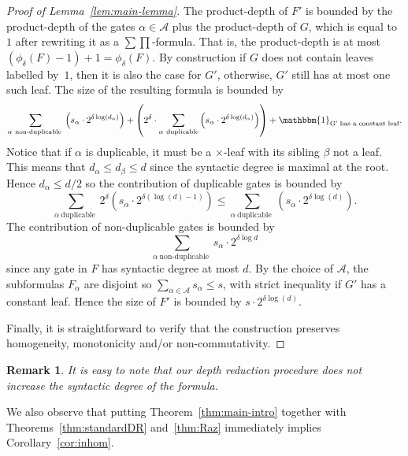 \documentclass[11pt,a4paper]{article}
\newtheorem{remark}[theorem]{Remark}
\newcommand{\comment}[2]{\marginpar{\tiny{\textbf{#1: }\textit{#2}}}}
\newcommand{\nl}[1]{\comment{NL}{#1}}
\begin{document}
\begin{proof}[Proof of Lemma~\ref{lem:main-lemma}]
	
	The product-depth of $F'$ is bounded by the product-depth of the gates $\alpha \in \mathcal{A}$ plus the product-depth of $G$, which is equal to $1$ after rewriting it as a $\sum\prod$-formula. That is, the product-depth is at most  \((\phi_{\delta}(F)-1)+1 = \phi_{\delta}(F)\). By construction if \(G\) does not contain  leaves labelled by~$1$, then it is also the case for \(G'\), otherwise, \(G'\) still has at most one such leaf.
	The size of the resulting formula is bounded by
	\[ 	\sum_{\alpha\ \text{non-duplicable }} \left(s_\alpha \cdot 2^{\delta \log(d_\alpha)} \right)  
	+
	\left( 2^{\delta} \cdot \sum_{\alpha\ \text{duplicable}} \left(s_\alpha \cdot 2^{\delta \log(d_\alpha)} \right) \right) 
	+ \mathbbm{1}_{\text{G' has a constant leaf}} . \]
	Notice that if $\alpha$ is duplicable, it must be a \(\times\)-leaf with its sibling $\beta$ not a leaf. This
	means that $d_\alpha \leq d_\beta \leq d$ since the syntactic degree is maximal at the root. Hence $d_\alpha \leq d/2$
	so the contribution of duplicable gates is bounded by
	$$\sum_{\alpha\ \text{duplicable }} 2^\delta \left(s_\alpha \cdot 2^{\delta \left(\log(d)-1\right)} \right)
	\leq \sum_{\alpha\ \text{duplicable }} \left(s_\alpha \cdot 2^{\delta \log(d)} \right).$$
	The
	contribution of non-duplicable gates is bounded by
	$$\sum_{\alpha\ \text{non-duplicable }} s_\alpha \cdot 2^{\delta \log d}$$
	since any gate in $F$ has syntactic degree at most $d$.
	By the choice of $\mathcal{A}$, the subformulas $F_\alpha$ are disjoint
	so $\sum_{\alpha \in \mathcal{A}} s_\alpha \leq s$, with strict inequality if $G'$ has a constant leaf.
	Hence
	the size of $F'$ is bounded by $s\cdot 2^{\delta \log(d)}$.
	
	Finally, it is straightforward to verify that the construction preserves homogeneity, monotonicity and/or non-commutativity.
\end{proof}

\begin{remark}
	\label{rmk:degree-not-increase}
	It is easy to note that our depth reduction procedure does not increase the syntactic degree of the formula. 
\end{remark} %

We also observe that putting Theorem~\ref{thm:main-intro} together with Theorems~\ref{thm:standardDR} and~\ref{thm:Raz} immediately implies Corollary~\ref{cor:inhom}.
\end{document}
